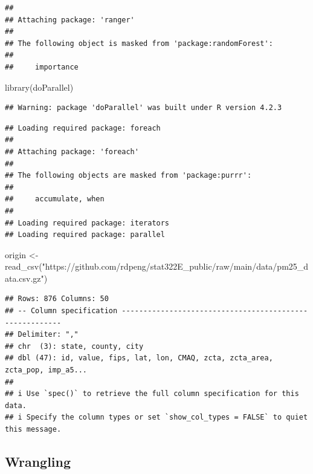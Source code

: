 \documentclass[
]{article}
\newenvironment{Shaded}{\begin{snugshade}}{\end{snugshade}}
\newcommand{\FunctionTok}[1]{\textcolor[rgb]{0.00,0.00,0.00}{#1}}
\newcommand{\NormalTok}[1]{#1}
\newcommand{\OtherTok}[1]{\textcolor[rgb]{0.56,0.35,0.01}{#1}}
\newcommand{\StringTok}[1]{\textcolor[rgb]{0.31,0.60,0.02}{#1}}
\begin{document}
\begin{verbatim}
## 
## Attaching package: 'ranger'
## 
## The following object is masked from 'package:randomForest':
## 
##     importance
\end{verbatim}

\begin{Shaded}
\begin{Highlighting}[]
\FunctionTok{library}\NormalTok{(doParallel)}
\end{Highlighting}
\end{Shaded}

\begin{verbatim}
## Warning: package 'doParallel' was built under R version 4.2.3
\end{verbatim}

\begin{verbatim}
## Loading required package: foreach
## 
## Attaching package: 'foreach'
## 
## The following objects are masked from 'package:purrr':
## 
##     accumulate, when
## 
## Loading required package: iterators
## Loading required package: parallel
\end{verbatim}

\begin{Shaded}
\begin{Highlighting}[]
\NormalTok{origin }\OtherTok{\textless{}{-}} \FunctionTok{read\_csv}\NormalTok{(}\StringTok{"https://github.com/rdpeng/stat322E\_public/raw/main/data/pm25\_data.csv.gz"}\NormalTok{)}
\end{Highlighting}
\end{Shaded}

\begin{verbatim}
## Rows: 876 Columns: 50
## -- Column specification --------------------------------------------------------
## Delimiter: ","
## chr  (3): state, county, city
## dbl (47): id, value, fips, lat, lon, CMAQ, zcta, zcta_area, zcta_pop, imp_a5...
## 
## i Use `spec()` to retrieve the full column specification for this data.
## i Specify the column types or set `show_col_types = FALSE` to quiet this message.
\end{verbatim}

\hypertarget{wrangling}{%
\subsection{Wrangling}\label{wrangling}}
\end{document}
